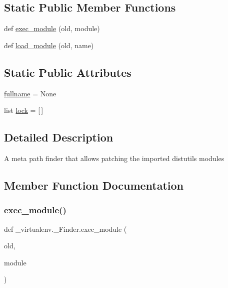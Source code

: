 \subsection*{Static Public Member Functions}
\begin{DoxyCompactItemize}
\item 
def \hyperlink{class__virtualenv_1_1__Finder_ac3e166072e0d084307d4c690740ccc49}{exec\+\_\+module} (old, module)
\item 
def \hyperlink{class__virtualenv_1_1__Finder_a04a07f3a9a12048b16b9180084acaa43}{load\+\_\+module} (old, name)
\end{DoxyCompactItemize}
\subsection*{Static Public Attributes}
\begin{DoxyCompactItemize}
\item 
\hyperlink{class__virtualenv_1_1__Finder_a9bbc4fbd9e39891ce15c7fcd9020fbab}{fullname} = None
\item 
list \hyperlink{class__virtualenv_1_1__Finder_aa9359c1e8bce6138077924af89fbc99a}{lock} = \mbox{[}$\,$\mbox{]}
\end{DoxyCompactItemize}


\subsection{Detailed Description}
\begin{DoxyVerb}A meta path finder that allows patching the imported distutils modules\end{DoxyVerb}
 

\subsection{Member Function Documentation}
\mbox{\label{class__virtualenv_1_1__Finder_ac3e166072e0d084307d4c690740ccc49}} 
\subsubsection{\texorpdfstring{exec\+\_\+module()}{exec\_module()}}
{\footnotesize\ttfamily def \+\_\+virtualenv.\+\_\+\+Finder.\+exec\+\_\+module (\begin{DoxyParamCaption}\item[{}]{old,  }\item[{}]{module }\end{DoxyParamCaption})\hspace{0.3cm}{\ttfamily [static]}}

